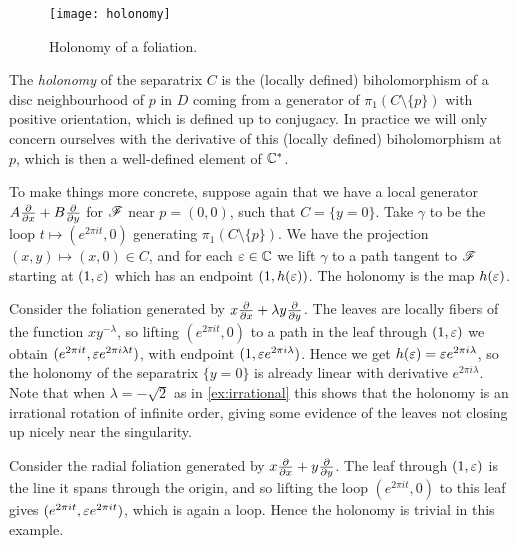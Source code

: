 \begin{figure}[H]
    \centering
    \texttt{[image: holonomy]}
    \caption{Holonomy of a foliation.}
\end{figure}

\begin{definition}
    The \emph{holonomy} of the separatrix $C$ is the (locally defined)
    biholomorphism of a disc neighbourhood of $p$ in $D$ coming from a generator
    of $\pi_1(C\setminus\{p\})$ with positive orientation, which is defined up
    to conjugacy. In practice we will only concern ourselves with the derivative
    of this (locally defined) biholomorphism at $p$, which is then a
    well-defined element of $\mathbb{C}^*$.
\end{definition}

To make things more concrete, suppose again that we have a local generator
$A\pdv{}{x}+B\pdv{}{y}$ for $\mathscr{F}$ near $p=(0,0)$, such that $C=\{y=0\}$. Take
$\gamma$ to be the loop $t\mapsto(e^{2\pi it},0)$ generating
$\pi_1(C\setminus\{p\})$. We have the projection $(x,y)\mapsto(x,0)\in C$, and
for each $\varepsilon\in\mathbb{C}$ we lift $\gamma$ to a path tangent to $\mathscr{F}$ starting at
$(1,\varepsilon)$ which has an endpoint $(1,h(\varepsilon))$. The holonomy is the map
$h(\varepsilon)$.

\begin{example}
    Consider the foliation generated by $x\pdv{}{x}+\lambda y\pdv{}{y}$. The
    leaves are locally fibers of the function $xy^{-\lambda}$, so lifting
    $(e^{2\pi it},0)$ to a path in the leaf through $(1,\varepsilon)$ we obtain
    $(e^{2\pi it},\varepsilon e^{2\pi i\lambda t})$, with endpoint
    $(1,\varepsilon e^{2\pi i\lambda})$. Hence we get
    $h(\varepsilon)=\varepsilon e^{2\pi i\lambda}$, so the holonomy of the separatrix
    $\{y=0\}$ is already linear with derivative $e^{2\pi i\lambda}$. Note that
    when $\lambda=-\sqrt2$ as in \cref{ex:irrational} this shows that the
    holonomy is an irrational rotation of infinite order, giving some evidence
    of the leaves not closing up nicely near the singularity.
\end{example}

\begin{example}
    Consider the radial foliation generated by $x\pdv{}{x}+y\pdv{}{y}$. The leaf
    through $(1,\varepsilon)$ is the line it spans through the origin, and so lifting
    the loop $(e^{2\pi it},0)$ to this leaf gives
    $(e^{2\pi it},\varepsilon e^{2\pi it})$, which is again a loop. Hence the holonomy
    is trivial in this example. %
\end{example}

